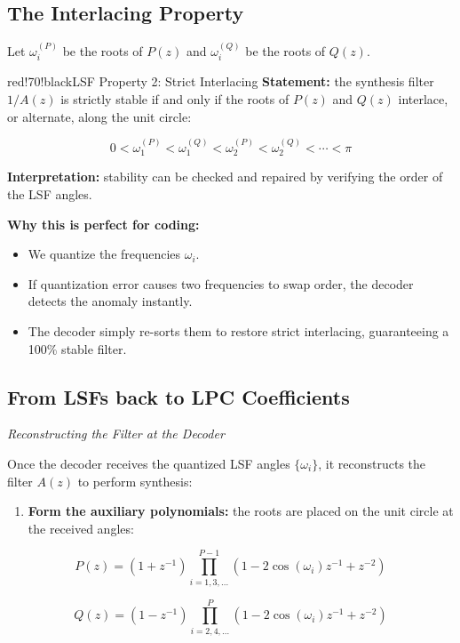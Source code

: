 \subsection{The Interlacing Property}

Let $\omega_i^{(P)}$ be the roots of $P(z)$ and $\omega_i^{(Q)}$ be the roots of $Q(z)$.

\begin{calloutbox}{red!70!black}{LSF Property 2: Strict Interlacing}
\textbf{Statement:} the synthesis filter $1/A(z)$ is strictly stable if and only if the roots of $P(z)$ and $Q(z)$ interlace, or alternate, along the unit circle:

\[
0 < \omega_1^{(P)} < \omega_1^{(Q)} < \omega_2^{(P)} < \omega_2^{(Q)} < \cdots < \pi
\]

\textbf{Interpretation:} stability can be checked and repaired by verifying the order of the LSF angles.
\end{calloutbox}

\textbf{Why this is perfect for coding:}

\begin{itemize}
\item We quantize the frequencies $\omega_i$.
\item If quantization error causes two frequencies to swap order, the decoder detects the anomaly instantly.
\item The decoder simply re-sorts them to restore strict interlacing, guaranteeing a 100\% stable filter.
\end{itemize}

\subsection{From LSFs back to LPC Coefficients}

\textit{Reconstructing the Filter at the Decoder}

Once the decoder receives the quantized LSF angles $\{\omega_i\}$, it reconstructs the filter $A(z)$ to perform synthesis:

\begin{enumerate}
\item \textbf{Form the auxiliary polynomials:} the roots are placed on the unit circle at the received angles:
\end{enumerate}

\[
P(z) = (1 + z^{-1}) \prod_{i=1,3,\ldots}^{P-1} (1 - 2\cos(\omega_i)z^{-1} + z^{-2})
\]

\[
Q(z) = (1 - z^{-1}) \prod_{i=2,4,\ldots}^{P} (1 - 2\cos(\omega_i)z^{-1} + z^{-2})
\]

